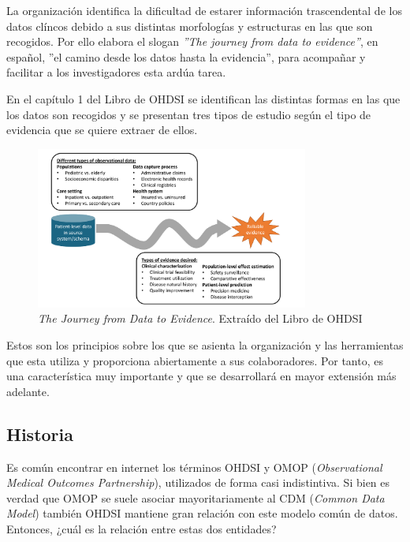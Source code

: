 La organización identifica la dificultad de estarer información trascendental de los datos clíncos debido a sus distintas morfologías y estructuras en las que son recogidos. Por ello elabora el slogan \textit{''The journey from data to evidence''}, en español, ''el camino desde los datos hasta la evidencia'', para acompañar y facilitar a los investigadores esta ardúa tarea.

En el capítulo 1 del Libro de OHDSI se identifican las distintas formas en las que los datos son recogidos y se presentan tres tipos de estudio según el tipo de evidencia que se quiere extraer de ellos.

\begin{figure}[H]
    \centering
    \includegraphics[width=0.80\textwidth]{figures/journeyDataToEvidence.png}
     \caption{\textit{The Journey from Data to Evidence}. Extraído del Libro de OHDSI \cite{OHDSIbook}}
    \label{fig:journeyDataToEvidence}
\end{figure}

Estos son los principios sobre los que se asienta la organización y las herramientas que esta utiliza y proporciona abiertamente a sus colaboradores. Por tanto, es una característica muy importante y que se desarrollará en mayor extensión más adelante.    

\subsection{Historia}

Es común encontrar en internet los términos OHDSI y OMOP (\textit{Observational Medical Outcomes Partnership}), utilizados de forma casi indistintiva. Si bien es verdad que OMOP se suele asociar mayoritariamente al CDM (\textit{Common Data Model}) también OHDSI mantiene gran relación con este modelo común de datos. Entonces, ¿cuál es la relación entre estas dos entidades? 

